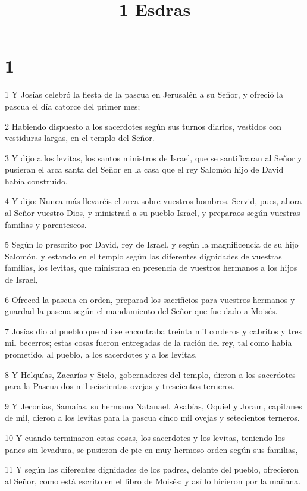 

\title{1 Esdras}


\chapter{1}

\par 1 Y Josías celebró la fiesta de la pascua en Jerusalén a su Señor, y ofreció la pascua el día catorce del primer mes;
\par 2 Habiendo dispuesto a los sacerdotes según sus turnos diarios, vestidos con vestiduras largas, en el templo del Señor.
\par 3 Y dijo a los levitas, los santos ministros de Israel, que se santificaran al Señor y pusieran el arca santa del Señor en la casa que el rey Salomón hijo de David había construido.
\par 4 Y dijo: Nunca más llevaréis el arca sobre vuestros hombros. Servid, pues, ahora al Señor vuestro Dios, y ministrad a su pueblo Israel, y preparaos según vuestras familias y parentescos.
\par 5 Según lo prescrito por David, rey de Israel, y según la magnificencia de su hijo Salomón, y estando en el templo según las diferentes dignidades de vuestras familias, los levitas, que ministran en presencia de vuestros hermanos a los hijos de Israel,
\par 6 Ofreced la pascua en orden, preparad los sacrificios para vuestros hermanos y guardad la pascua según el mandamiento del Señor que fue dado a Moisés.
\par 7 Josías dio al pueblo que allí se encontraba treinta mil corderos y cabritos y tres mil becerros; estas cosas fueron entregadas de la ración del rey, tal como había prometido, al pueblo, a los sacerdotes y a los levitas.
\par 8 Y Helquías, Zacarías y Sielo, gobernadores del templo, dieron a los sacerdotes para la Pascua dos mil seiscientas ovejas y trescientos terneros.
\par 9 Y Jeconías, Samaías, su hermano Natanael, Asabías, Oquiel y Joram, capitanes de mil, dieron a los levitas para la pascua cinco mil ovejas y setecientos terneros.
\par 10 Y cuando terminaron estas cosas, los sacerdotes y los levitas, teniendo los panes sin levadura, se pusieron de pie en muy hermoso orden según sus familias,
\par 11 Y según las diferentes dignidades de los padres, delante del pueblo, ofrecieron al Señor, como está escrito en el libro de Moisés; y así lo hicieron por la mañana.
